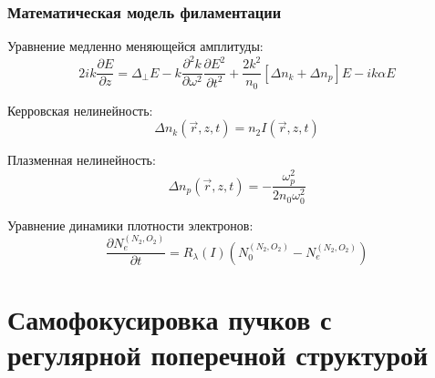 \documentclass[fullscreen=true,unicode,bookmarks=true]{beamer}
\begin{document}
    \begin{frame}
        \frametitle{Математическая модель филаментации}
		
        Уравнение медленно меняющейся амплитуды:
        \begin{equation*}
        	2ik\frac{\partial E}{\partial z} =
        	\Delta_{\perp}E -
        	k\frac{\partial^2 k}{\partial \omega^2}\frac{\partial E^2}{\partial t^2} + 
        	\frac{2k^2}{n_0}\left[ \Delta n_k + \Delta n_p \right] E  - i k \alpha E
        \end{equation*}

		Керровская нелинейность:
        \begin{equation*}
			\Delta n_k(\vec{r}, z, t) = n_2 I(\vec{r}, z, t)
		\end{equation*}
		
		Плазменная нелинейность:
        \begin{equation*}
			\Delta n_p(\vec{r}, z, t) = -\frac{\omega_p^2}{2 n_0 \omega_0^2}
		\end{equation*}
		
		Уравнение динамики плотности электронов:
        \begin{equation*}
			\dfrac{\partial N_{e}^{(N_2,O_2)}}{\partial t} = R_{\lambda}(I)\left(N_{0}^{(N_2,O_2)} - N_{e}^{(N_2,O_2)}\right)
		\end{equation*}
    \end{frame}
    
	\section{Самофокусировка пучков с регулярной поперечной структурой}
	
\end{document}
